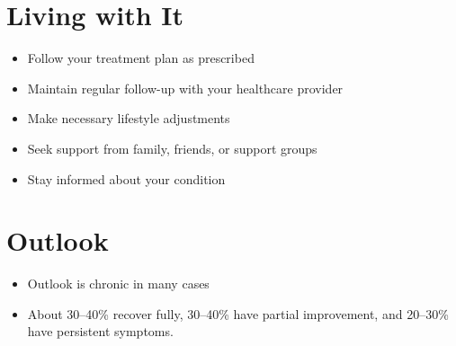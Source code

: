 \section{Living with It}
\begin{itemize}[noitemsep]
  \item Follow your treatment plan as prescribed
  \item Maintain regular follow-up with your healthcare provider
  \item Make necessary lifestyle adjustments
  \item Seek support from family, friends, or support groups
  \item Stay informed about your condition
\end{itemize}
\section{Outlook}
\begin{itemize}[noitemsep]
  \item Outlook is chronic in many cases
  \item About 30--40\% recover fully, 30--40\% have partial improvement, and 20--30\% have persistent symptoms.
\end{itemize}
